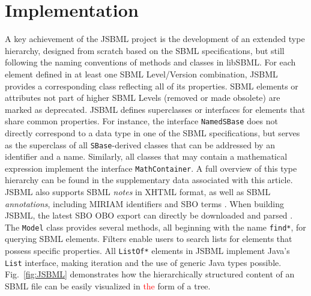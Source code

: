 \documentclass{bioinfo}
\begin{document}


\section{\textcolor[rgb]{1,0,0}{Implementation}}

A key achievement of the JSBML project is the development of an extended type
hierarchy, designed from scratch based on the SBML specifications, but still
following the naming conventions of methods and classes in
libSBML. For each element defined in at least one SBML Level/Version combination,
JSBML provides a corresponding class reflecting all of its properties. SBML
elements or attributes not part of higher SBML Levels (removed or made
obsolete) are marked as deprecated. JSBML defines superclasses or interfaces for
elements that share common properties. For instance, the interface
\texttt{NamedSBase} does not directly correspond to a data type in one of the
SBML specifications, but serves as the superclass of all \texttt{SBase}-derived
classes that can be addressed by an identifier and a name. Similarly, all classes
that may contain a mathematical expression implement the
interface \texttt{MathContainer}. A full overview of this type hierarchy can be
found in the supplementary data associated with this article. JSBML also
supports SBML \emph{notes} in XHTML format, as well as SBML
\emph{annotations}, including MIRIAM identifiers \citep{Novere2005} and
SBO terms \citep{Novere2006b}.
When building JSBML, the latest SBO OBO export can directly be downloaded and
parsed \citep{Holland2008}.
The \texttt{Model} class provides several methods, all beginning with the name
\texttt{find*}, for querying SBML elements. Filters enable users to search lists
for elements that possess specific properties. All \texttt{ListOf*} elements in
JSBML implement Java's \texttt{List} interface, making iteration and the use of
generic Java types possible. Fig.~\ref{fig:JSBML} demonstrates how the
hierarchically structured content of an SBML file can be easily visualized in \textcolor{red}{the} form
of a tree.
\end{document}
